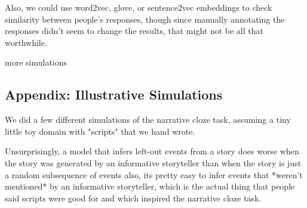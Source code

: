 \documentclass[10pt,a4paper]{article}
\newcommand{\todo}[1]{{\color{red}#1}}
\begin{document}
\todo{Also, we could use word2vec, glove, or sentence2vec embeddings to check similarity between people's responses, though since manually annotating the responses didn't seem to change the results, that might not be all that worthwhile.}

\todo{more simulations}





\setlength{\bibleftmargin}{.125in}
\setlength{\bibindent}{-\bibleftmargin}



\subsection{Appendix: Illustrative Simulations}

\todo{
We did a few different simulations of the narrative cloze task, assuming a tiny little toy domain with "scripts" that we hand wrote.

Unsurprisingly,
a model that infers left-out events from a story does worse when the story was generated by an informative storyteller than when the story is just a random subsequence of events
also, its pretty easy to infer events that *weren't mentioned* by an informative storyteller, which is the actual thing that people said scripts were good for and which inspired the narrative cloze task.
}
\end{document}
